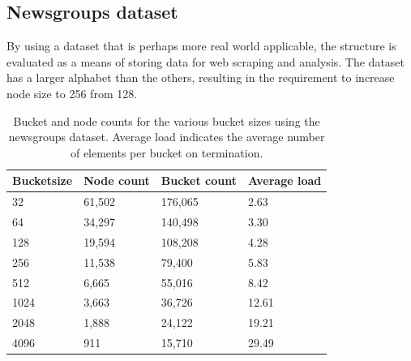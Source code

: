 \subsection{Newsgroups dataset}
By using a dataset that is perhaps more real world applicable, the structure is
evaluated as a means of storing data for web scraping and analysis. The dataset has a 
larger alphabet than the others, resulting in the requirement to increase
node size to 256 from 128.

\begin{table}[h]
    \centering
    \begin{tabular}[here]{ l l l l }
        \hline
        Bucketsize& Node count  & Bucket count & Average load  \\\hline
        32        &  61,502     & 176,065      & 2.63\\
        64        &  34,297     & 140,498      & 3.30\\
        128       &  19,594     & 108,208      & 4.28\\
        256       &  11,538     & 79,400       & 5.83\\
        512       &  6,665      & 55,016       & 8.42\\
        1024      &  3,663      & 36,726       & 12.61\\ 
        2048      &  1,888      & 24,122       & 19.21\\ 
        4096      &  911        & 15,710       & 29.49\\\hline 
    \end{tabular}
    \caption{Bucket and node counts for the various bucket sizes using the
    newsgroups dataset. Average load indicates the average number of elements
    per bucket on termination.}
    \label{tab:bncounts_ngrp}
\end{table}
